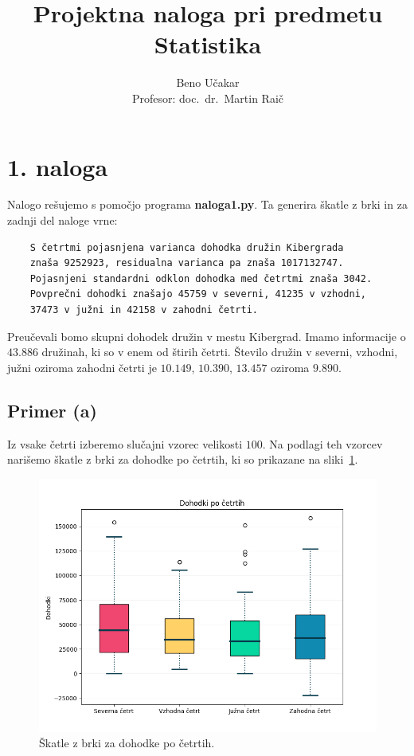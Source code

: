 \documentclass[a4paper,11pt]{article}
\begin{document}
\title{Projektna naloga pri predmetu Statistika}
\author{Beno Učakar \\ Profesor: doc.~dr.~Martin Raič}
\date{}


\maketitle


\section*{1. naloga}

Nalogo rešujemo s pomočjo programa \textbf{naloga1.py}. 
Ta generira škatle z brki in za zadnji del naloge vrne:
\begin{verbatim}
    S četrtmi pojasnjena varianca dohodka družin Kibergrada
    znaša 9252923, residualna varianca pa znaša 1017132747.
    Pojasnjeni standardni odklon dohodka med četrtmi znaša 3042.
    Povprečni dohodki znašajo 45759 v severni, 41235 v vzhodni,
    37473 v južni in 42158 v zahodni četrti.
\end{verbatim}

Preučevali bomo skupni dohodek družin v mestu Kibergrad.
Imamo informacije o $43.886$ družinah, ki so v enem od štirih četrti. 
Število družin v severni, vzhodni, južni oziroma zahodni četrti je $10.149$, $10.390$, $13.457$ oziroma $9.890$.

\subsection*{Primer (a)}

Iz vsake četrti izberemo slučajni vzorec velikosti $100$. 
Na podlagi teh vzorcev narišemo škatle z brki za dohodke po četrtih, ki so prikazane na sliki~\ref{brke_po_cetrtih}.

\begin{figure}[H]
    \centering
    \includegraphics[scale=0.65]{Skatle_z_brki_Cetrti.png}
    \caption{Škatle z brki za dohodke po četrtih.}
    \label{brke_po_cetrtih}
\end{figure}
\end{document}
